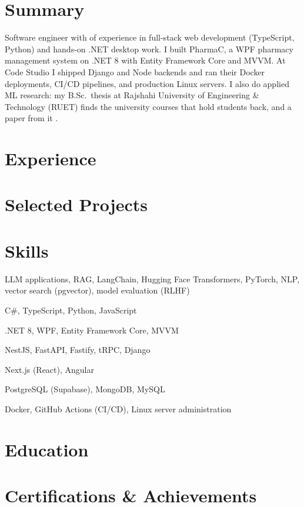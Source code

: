 \documentclass[10pt, a4paper]{article}
\begin{document}
\color{primary}
\cvheader

\section{Summary}
Software engineer with \factExpYears{} of experience in full-stack web development (TypeScript, Python) and hands-on .NET desktop work. I built PharmaC, a WPF pharmacy management system on .NET 8 with Entity Framework Core and MVVM. At Code Studio I shipped Django and Node backends and ran their Docker deployments, CI/CD pipelines, and production Linux servers. I also do applied ML research: my B.Sc.\ thesis at Rajshahi University of Engineering \& Technology (RUET) finds the university courses that hold students back, and a paper from it \factLakIs{}.

\section{Experience}




\section{Selected Projects}



\section{Skills}
\begin{description}[style=unboxed, leftmargin=0pt, itemsep=0.2ex]
    \item[AI/ML:] LLM applications, RAG, LangChain, Hugging Face Transformers, PyTorch, NLP, vector search (pgvector), model evaluation (RLHF)
    \item[Languages:] C\#, TypeScript, Python, JavaScript
    \item[.NET:] .NET 8, WPF, Entity Framework Core, MVVM
    \item[Backend:] NestJS, FastAPI, Fastify, tRPC, Django
    \item[Frontend:] Next.js (React), Angular
    \item[Databases:] PostgreSQL (Supabase), MongoDB, MySQL
    \item[DevOps:] Docker, GitHub Actions (CI/CD), Linux server administration
\end{description}

\section{Education}
\def\eduthesisline{}


\section{Certifications \& Achievements}
\def\certindustry{}

\end{document}
